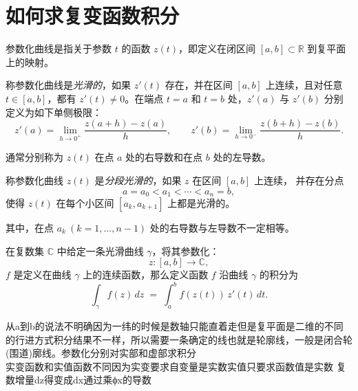 \documentclass[lang=cn,10pt]{elegantbook}
\begin{document}
\section{如何求复变函数积分}
\begin{definition}[曲线光滑]
参数化曲线是指关于参数 $t$ 的函数 $z(t)$，即定义在闭区间 $[a,b] \subset \mathbb{R}$ 到复平面上的映射。

\medskip
称参数化曲线是\emph{光滑的}，如果 $z'(t)$ 存在，并在区间 $[a,b]$ 上连续，且对任意 $t \in [a,b]$，都有 $z'(t) \neq 0$。在端点 $t=a$ 和 $t=b$ 处，$z'(a)$ 与 $z'(b)$ 分别定义为如下单侧极限：
\[
z'(a) = \lim_{h \to 0^{+}} \frac{z(a+h)-z(a)}{h}, 
\qquad 
z'(b) = \lim_{h \to 0^{-}} \frac{z(b+h)-z(b)}{h}.
\]

通常分别称为 $z(t)$ 在点 $a$ 处的右导数和在点 $b$ 处的左导数。
\end{definition}
\begin{lemma}[分段光滑曲线]
称参数化曲线 $z(t)$ 是\emph{分段光滑的}，如果 $z$ 在区间 $[a,b]$ 上连续，  
并存在分点
\[
a = a_0 < a_1 < \cdots < a_n = b,
\]
使得 $z(t)$ 在每个小区间 $[a_k, a_{k+1}]$ 上都是光滑的。

其中，在点 $a_k \ (k=1, \ldots, n-1)$ 处的右导数与左导数不一定相等。
\end{lemma}
\begin{definition}[复变函数积分]
    在复数集 $\mathbb{C}$ 中给定一条光滑曲线 $\gamma$，将其参数化：
\[
z:[a,b]\to \mathbb{C},
\]
$f$ 是定义在曲线 $\gamma$ 上的连续函数，那么定义函数 $f$ 沿曲线 $\gamma$ 的积分为
\[
\int_{\gamma} f(z)\,dz \;=\; \int_a^b f(z(t))\,z'(t)\,dt.
\]
\end{definition}
从a到b的说法不明确因为一纬的时候是数轴只能直着走但是复平面是二维的不同的行进方式积分结果不一样，所以需要一条确定的线也就是轮廓线，一般是闭合轮(围道)廓线。参数化分别对实部和虚部求积分\\实变函数和实值函数不同因为实变要求自变量是实数实值只要求函数值是实数
复数增量dz得变成dx通过乘ϕx的导数
\end{document}
